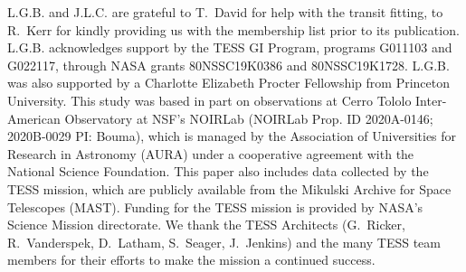 \documentclass[12pt,modern,tighten]{aastex63}
\begin{document}



\acknowledgements
\raggedbottom

L.G.B{.} and J.L.C{.} are grateful to T{.}~David for help with the
transit fitting, to R{.}~Kerr for kindly providing us with the
\citet{kerr_stars_2021} membership list prior to its publication.
%
L.G.B{.} acknowledges support by the TESS GI Program, programs
G011103 and G022117, through NASA grants 80NSSC19K0386 and
80NSSC19K1728.
%
L.G.B{.} was also supported by a Charlotte Elizabeth Procter
Fellowship from Princeton University.
%
This study was based in part on observations at Cerro Tololo
Inter-American Observatory at NSF's NOIRLab (NOIRLab Prop{.} ID
2020A-0146; 2020B-0029 PI: Bouma), which is managed by the
Association of Universities for Research in Astronomy (AURA) under a
cooperative agreement with the National Science Foundation.
%
%
This paper also includes data collected by the TESS mission, which are
publicly available from the Mikulski Archive for Space Telescopes
(MAST).
%
Funding for the TESS mission is provided by NASA's Science Mission
directorate.
%
We thank the TESS Architects (G.~Ricker, R.~Vanderspek, D.~Latham,
S.~Seager, J.~Jenkins) and the many TESS team members for their
efforts to make the mission a continued success.
%

%
%


%
\end{document}
